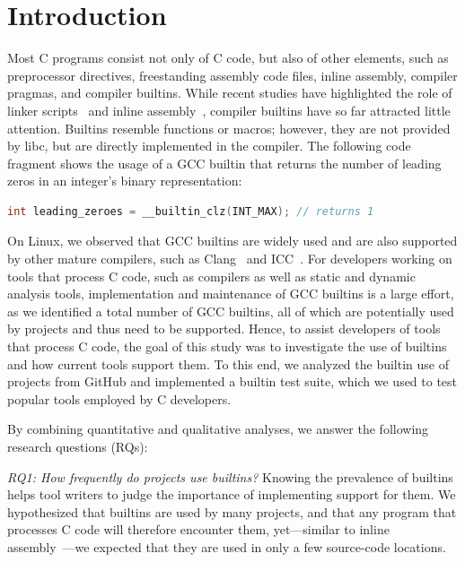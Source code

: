 \documentclass[sigconf,screen]{acmart}
\begin{document}



\maketitle

\section{Introduction}
Most C programs consist not only of C code, but also of other elements, such as preprocessor directives, freestanding assembly code files, inline assembly, compiler pragmas, and compiler builtins.
While recent studies have highlighted the role of linker scripts~\cite{linkers} and inline assembly~\cite{inlineassembly}, compiler builtins have so far attracted little attention.
Builtins resemble functions or macros; however, they are not provided by libc, but are directly implemented in the compiler.
The following code fragment shows the usage of a GCC builtin that returns the number of leading zeros in an integer's binary representation:
\begin{lstlisting}[language=C, label={leadingzeroes}]
    int leading_zeroes = __builtin_clz(INT_MAX); // returns 1
\end{lstlisting}
On Linux, we observed that GCC builtins are widely used and are also supported by other mature compilers, such as Clang~\cite{clanggccsupport} and ICC~\cite{iccgccsupport}.
For developers working on tools that process C code, such as compilers as well as static and dynamic analysis tools, implementation and maintenance of GCC builtins is a large effort, as we identified a total number of \nrTotalTerms{} GCC builtins, all of which are potentially used by projects and thus need to be supported.
Hence, to assist developers of tools that process C code, the goal of this study was to investigate the use of builtins and how current tools support them.
To this end, we analyzed the builtin use of \nrProjects{} projects from GitHub and implemented a builtin test suite, which we used to test popular tools employed by C developers.

By combining quantitative and qualitative analyses, we answer the following research questions (RQs):

\emph{RQ1: How frequently do projects use builtins?}
Knowing the prevalence of builtins helps tool writers to judge the importance of implementing support for them.
We hypothesized that builtins are used by many projects, and that any program that processes C code will therefore encounter them, yet---similar to inline assembly~\cite{inlineassembly}---we expected that they are used in only a few source-code locations.
\end{document}

